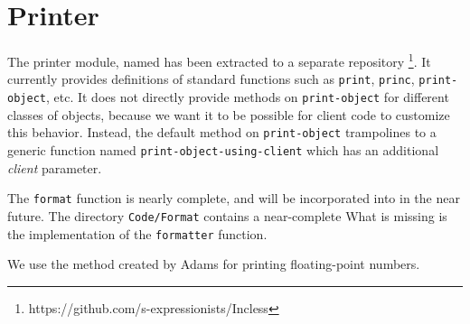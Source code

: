 \chapter{Printer}
\label{chap-printer}

The printer module, named \incless{} has been extracted to a separate
repository%
\footnote{https://github.com/s-expressionists/Incless}.
It currently provides definitions of standard functions such as
\texttt{print}, \texttt{princ}, \texttt{print-object}, etc.  It does
not directly provide methods on \texttt{print-object} for different
classes of objects, because we want it to be possible for client code
to customize this behavior.  Instead, the default method on
\texttt{print-object} trampolines to a generic function named
\texttt{print-object-using-client} which has an additional
\emph{client} parameter.

The \texttt{format} function is nearly complete, and will be
incorporated into \incless{} in the near future.  The directory
\texttt{Code/Format} contains a near-complete What is missing is the
implementation of the \texttt{formatter} function.

We use the method created by Adams
\cite{Adams:2018:RFF:3296979.3192369} for printing floating-point
numbers.


